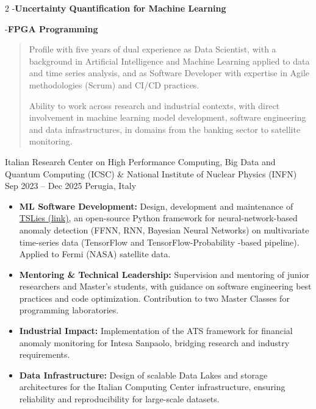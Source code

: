 \documentclass[9pt,a4paper,withhyper,normalphoto]{altacv}
\begin{document}
\begin{paracol}{2}
-\textbf{Uncertainty Quantification for Machine Learning}

-\textbf{FPGA Programming}
\switchcolumn


\begin{quote}
\begin{justify}

Profile with five years of dual experience as Data Scientist, with a background in Artificial Intelligence and Machine Learning applied to data and time series analysis, and as Software Developer with expertise in Agile methodologies (Scrum) and CI/CD practices.

Ability to work across research and industrial contexts, with direct involvement in machine learning model development, software engineering and data infrastructures, in domains from the banking sector to satellite monitoring.
\end{justify}

\end{quote}


{Italian Research Center on High Performance Computing, Big Data and Quantum Computing (ICSC) \& National Institute of Nuclear Physics (INFN)}
{Sep 2023 -- Dec 2025}
{Perugia, Italy}

\begin{itemize}
\item \textbf{ML Software Development:} Design, development and maintenance of \href{https://github.com/andreaadelfio/TSLies}{TSLies (link)}, an open-source Python framework for neural-network-based anomaly detection (FFNN, RNN, Bayesian Neural Networks) on multivariate time-series data (TensorFlow and TensorFlow-Probability -based pipeline). Applied to Fermi (NASA) satellite data.
\item \textbf{Mentoring \& Technical Leadership:} Supervision and mentoring of junior researchers and Master’s students, with guidance on software engineering best practices and code optimization. Contribution to two Master Classes for programming laboratories.
\item \textbf{Industrial Impact:} Implementation of the ATS framework for financial anomaly monitoring for Intesa Sanpaolo, bridging research and industry requirements.
\item \textbf{Data Infrastructure:} Design of scalable Data Lakes and storage architectures for the Italian Computing Center infrastructure, ensuring reliability and reproducibility for large-scale datasets.
\end{itemize}


\end{paracol}
\end{document}
